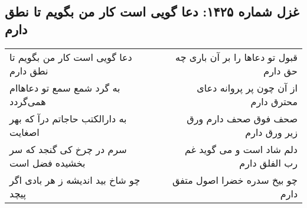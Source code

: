 \begin{center}
\section*{غزل شماره ۱۴۲۵: دعا گویی است کار من بگویم تا نطق دارم}
\label{sec:1425}
\begin{longtable}{l p{0.5cm} r}
دعا گویی است کار من بگویم تا نطق دارم
&&
قبول تو دعاها را بر آن باری چه حق دارم
\\
به گرد شمع سمع تو دعاهاام همی‌گردد
&&
از آن چون پر پروانه دعای محترق دارم
\\
به دارالکتب حاجاتم درآ که بهر اصغایت
&&
صحف فوق صحف دارم ورق زیر ورق دارم
\\
سرم در چرخ کی گنجد که سر بخشیده فضل است
&&
دلم شاد است و می گوید غم رب الفلق دارم
\\
چو شاخ بید اندیشه ز هر بادی اگر پیچد
&&
چو بیخ سدره خضرا اصول متفق دارم
\\
\end{longtable}
\end{center}
